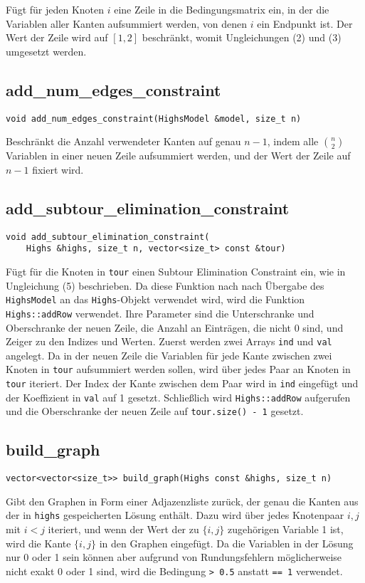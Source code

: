 \documentclass[a4paper, 10pt, ngerman]{article}
\begin{document}
\noindent Fügt für jeden Knoten $i$ eine Zeile in die Bedingungsmatrix ein, in der die Variablen aller Kanten aufsummiert werden, von denen $i$ ein Endpunkt ist. Der Wert der Zeile wird auf $[1, 2]$ beschränkt, womit Ungleichungen (2) und (3) umgesetzt werden.

\subsection{add\_num\_edges\_constraint}
\verb|void add_num_edges_constraint(HighsModel &model, size_t n)|
\medskip

\noindent Beschränkt die Anzahl verwendeter Kanten auf genau $n - 1$, indem alle $\binom n 2$ Variablen in einer neuen Zeile aufsummiert werden, und der Wert der Zeile auf $n - 1$ fixiert wird.

\subsection{add\_subtour\_elimination\_constraint}
\verb|void add_subtour_elimination_constraint(| \\
\verb|    Highs &highs, size_t n, vector<size_t> const &tour)|
\medskip

\noindent Fügt für die Knoten in \verb|tour| einen Subtour Elimination Constraint ein, wie in Ungleichung (5) beschrieben. Da diese Funktion nach nach Übergabe des \verb|HighsModel| an das \verb|Highs|-Objekt verwendet wird, wird die Funktion \verb|Highs::addRow| verwendet. Ihre Parameter sind die Unterschranke und Oberschranke der neuen Zeile, die Anzahl an Einträgen, die nicht 0 sind, und Zeiger zu den Indizes und Werten. Zuerst werden zwei Arrays \verb|ind| und \verb|val| angelegt. Da in der neuen Zeile die Variablen für jede Kante zwischen zwei Knoten in \verb|tour| aufsummiert werden sollen, wird über jedes Paar an Knoten in \verb|tour| iteriert. Der Index der Kante zwischen dem Paar wird in \verb|ind| eingefügt und der Koeffizient in \verb|val| auf 1 gesetzt. Schließlich wird \verb|Highs::addRow| aufgerufen und die Oberschranke der neuen Zeile auf \verb|tour.size() - 1| gesetzt.

\subsection{build\_graph}
\verb|vector<vector<size_t>> build_graph(Highs const &highs, size_t n)|
\medskip

\noindent Gibt den Graphen in Form einer Adjazenzliste zurück, der genau die Kanten aus der in \verb|highs| gespeicherten Lösung enthält. Dazu wird über jedes Knotenpaar $i, j$ mit $i < j$ iteriert, und wenn der Wert der zu $\{i, j\}$ zugehörigen Variable 1 ist, wird die Kante $\{i, j\}$ in den Graphen eingefügt. Da die Variablen in der Lösung nur 0 oder 1 sein können aber aufgrund von Rundungsfehlern möglicherweise nicht exakt 0 oder 1 sind, wird die Bedingung \verb|> 0.5| anstatt \verb|== 1| verwendet.
\end{document}

